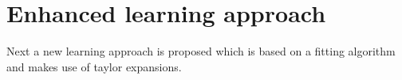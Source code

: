 \chapter{Enhanced learning approach\\}
\label{cha:Enhanced learning approach}
Next a new learning approach is proposed which is based on a fitting algorithm and makes use of taylor expansions. 